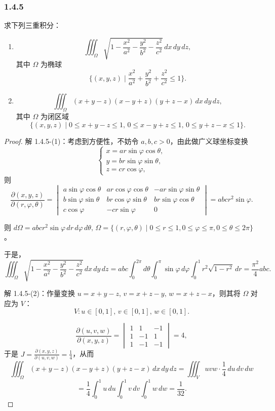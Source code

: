\documentclass[12pt]{ctexart}
\begin{document}
\subsubsection*{1.4.5}
求下列三重积分：
\begin{enumerate}
    \item 
    \[
    \iiint_{\Omega} \sqrt{1 - \frac{x^2}{a^2} - \frac{y^2}{b^2} - \frac{z^2}{c^2}} \, dx\,dy\,dz,
    \]
    其中 $\Omega$ 为椭球
    \[
    \{(x, y, z) \mid \frac{x^2}{a^2} + \frac{y^2}{b^2} + \frac{z^2}{c^2} \leq 1 \}.
    \]

    \item 
    \[
    \iiint_{\Omega} (x + y - z)(x - y + z)(y + z - x) \, dx\,dy\,dz,
    \]
    其中 $\Omega$ 为闭区域
    \[
    \{(x, y, z) \mid 0 \leq x + y - z \leq 1, \, 0 \leq x - y + z \leq 1, \, 0 \leq y + z - x \leq 1 \}.
    \]
\end{enumerate}

\begin{proof}
	解 1.4.5-(1)：考虑到方便性，不妨令 $a, b, c > 0$，由此做广义球坐标变换
\[
\begin{cases}
x = ar\sin\varphi\cos\theta, \\
y = br\sin\varphi\sin\theta, \\
z = cr\cos\varphi,
\end{cases}
\]
则
\[
\frac{\partial (x, y, z)}{\partial (r, \varphi, \theta)} =
\begin{vmatrix}
a\sin\varphi\cos\theta & ar\cos\varphi\cos\theta & -ar\sin\varphi\sin\theta \\
b\sin\varphi\sin\theta & br\cos\varphi\sin\theta & br\sin\varphi\cos\theta \\
c\cos\varphi & -cr\sin\varphi & 0
\end{vmatrix}
= abcr^2\sin\varphi.
\]

则 $d\Omega = abcr^2\sin\varphi \, dr \, d\varphi \, d\theta, \, \Omega = \{(r, \varphi, \theta) \mid 0 \leq r \leq 1, 0 \leq \varphi \leq \pi, 0 \leq \theta \leq 2\pi \}$。

于是，
\[
\iiint_{\Omega} \sqrt{1 - \frac{x^2}{a^2} - \frac{y^2}{b^2} - \frac{z^2}{c^2}} \, dx\,dy\,dz = abc \int_0^{2\pi} d\theta \int_0^{\pi} \sin\varphi \, d\varphi \int_0^1 r^2\sqrt{1 - r^2} \, dr = \frac{\pi^2}{4} abc.
\]

解 1.4.5-(2)：作量变换 $u = x + y - z, \, v = x + z - y, \, w = x + z - x$，则其将 $\Omega$ 对应为 $V$：
\[
V: u \in [0, 1], \, v \in [0, 1], \, w \in [0, 1].
\]

\[
\frac{\partial (u, v, w)}{\partial (x, y, z)} =
\begin{vmatrix}
1 & 1 & -1 \\
1 & -1 & 1 \\
1 & -1 & -1
\end{vmatrix}
= 4,
\]
于是 $J = \frac{\partial (x, y, z)}{\partial (u, v, w)} = \frac{1}{4}$，从而
\[
\iiint_{\Omega} (x + y - z)(x - y + z)(y + z - x) \, dx\,dy\,dz = \iiint_V uvw \cdot \frac{1}{4} \, du\,dv\,dw \]
\[
= \frac{1}{4} \int_0^1 u \, du \int_0^1 v \, dv \int_0^1 w \, dw = \frac{1}{32}.
\]

\end{proof}
\end{document}
